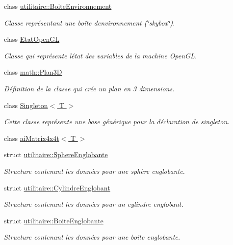 \begin{DoxyCompactItemize}
class \hyperlink{classutilitaire_1_1_boite_environnement}{utilitaire\+::\+Boite\+Environnement}
\begin{DoxyCompactList}\small\item\em Classe représentant une boîte d\textquotesingle{}environnement (\char`\"{}skybox\char`\"{}). \end{DoxyCompactList}\item 
class \hyperlink{class_etat_open_g_l}{Etat\+Open\+G\+L}
\begin{DoxyCompactList}\small\item\em Classe qui représente l\textquotesingle{}état des variables de la machine Open\+G\+L. \end{DoxyCompactList}\item 
class \hyperlink{classmath_1_1_plan3_d}{math\+::\+Plan3\+D}
\begin{DoxyCompactList}\small\item\em Définition de la classe qui crée un plan en 3 dimensions. \end{DoxyCompactList}\item 
class \hyperlink{class_singleton}{Singleton$<$ T $>$}
\begin{DoxyCompactList}\small\item\em Cette classe représente une base générique pour la déclaration de singleton. \end{DoxyCompactList}\item 
class \hyperlink{classai_matrix4x4t}{ai\+Matrix4x4t$<$ T $>$}
\item 
struct \hyperlink{structutilitaire_1_1_sphere_englobante}{utilitaire\+::\+Sphere\+Englobante}
\begin{DoxyCompactList}\small\item\em Structure contenant les données pour une sphère englobante. \end{DoxyCompactList}\item 
struct \hyperlink{structutilitaire_1_1_cylindre_englobant}{utilitaire\+::\+Cylindre\+Englobant}
\begin{DoxyCompactList}\small\item\em Structure contenant les données pour un cylindre englobant. \end{DoxyCompactList}\item 
struct \hyperlink{structutilitaire_1_1_boite_englobante}{utilitaire\+::\+Boite\+Englobante}
\begin{DoxyCompactList}\small\item\em Structure contenant les données pour une boite englobante. \end{DoxyCompactList}\item 

\end{DoxyCompactItemize}
